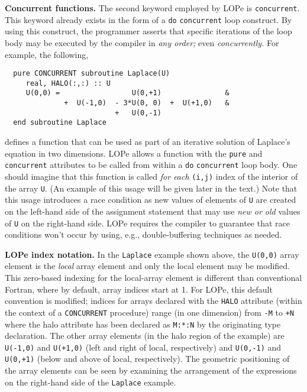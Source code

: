 \textbf{Concurrent functions.}
The second keyword employed by LOPe is \texttt{concurrent}.  This keyword already exists in the form
of a \texttt{do} \texttt{concurrent} loop construct.  By using this construct, the programmer
asserts that specific iterations of the loop body may be executed by the compiler in \emph{any
  order;} even \emph{concurrently.}
For example, the following,
\begin{verbatim}
  pure CONCURRENT subroutine Laplace(U)
     real, HALO(:,:) :: U
     U(0,0) =                 U(0,+1)               &
              +  U(-1,0)  - 3*U(0, 0)  +  U(+1,0)   &
                          +   U(0,-1)
  end subroutine Laplace
\end{verbatim}
defines a function that can be used as part of an iterative solution of Laplace's equation in two
dimensions.  LOPe allows a function with the \texttt{pure} and \texttt{concurrent} attributes to be
called from within a \texttt{do} \texttt{concurrent} loop body.  One should imagine that this
function is called \emph{for each} \texttt{(i,j)} index of the interior of the array \texttt{U}.
(An example of this usage will be given later in the text.)  Note that this usage introduces a race
condition as new values of elements of \texttt{U} are created on the left-hand side of the
assignment statement that may use \emph{new or old} values of \texttt{U} on the right-hand side.
LOPe requires the compiler to guarantee that race conditions won't occur by using, e.g.,
double-buffering techniques as needed.

\textbf{LOPe index notation.}
In the \texttt{Laplace} example shown above, the \texttt{U(0,0)} array element is the \emph{local}
array element and only the local element may be modified.  This zero-based indexing for the
local-array element is different than conventional Fortran, where by default, array indices start at
1.  For LOPe, this default convention is modified; indices for arrays declared with the
\texttt{HALO} attribute (within the context of a \texttt{CONCURRENT} procedure) range (in one
dimension) from \texttt{-M} to \texttt{+N} where the halo attribute has been declared as
\texttt{M:*:N} by the originating type declaration.  The other array elements (in the halo region of
the example) are \texttt{U(-1,0)} and \texttt{U(+1,0)} (left and right of local, respectively) and
\texttt{U(0,-1)} and \texttt{U(0,+1)} (below and above of local, respectively).  The geometric
positioning of the array elements can be seen by examining the arrangement of the expressions on the
right-hand side of the \texttt{Laplace} example.
